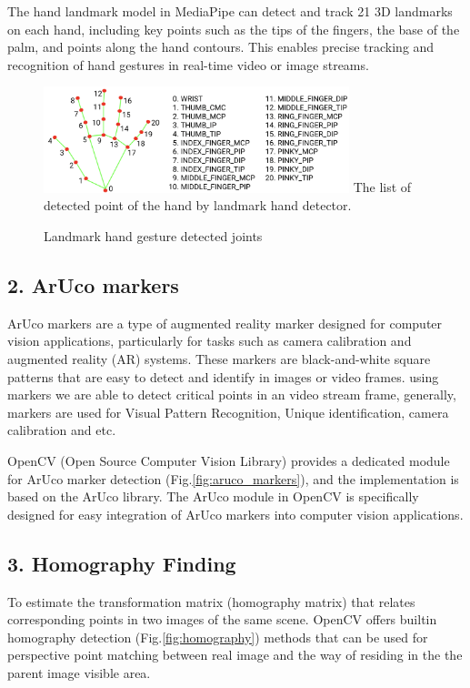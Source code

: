 \documentclass[journal]{IEEEtran}
\begin{document}
The hand landmark model in MediaPipe can detect and track 21 3D landmarks on each hand, including key points such as the tips 
of the fingers, the base of the palm, and points along the hand contours. This enables precise tracking and recognition of hand 
gestures in real-time video or image streams.

\begin{figure}[!t]
  \centering
  \includegraphics[width=3.5in]{photo/hand-landmarks.png}
  The list of detected point of the hand by landmark hand detector.
  \caption{Landmark hand gesture detected joints}
  \label{fig:landmark_hand}
\end{figure}

\subsection*{2. ArUco markers}

ArUco markers are a type of augmented reality marker designed for computer vision applications, particularly for tasks such as 
camera calibration and augmented reality (AR) systems. These markers are black-and-white square patterns that are easy to detect 
and identify in images or video frames. using markers we are able to detect critical points in an video stream frame, generally, 
markers are used for Visual Pattern Recognition, Unique identification, camera calibration and etc. 

OpenCV (Open Source Computer Vision Library) provides a dedicated module for ArUco marker detection (Fig.\ref{fig:aruco_markers}), and the implementation is 
based on the ArUco library. The ArUco module in OpenCV is specifically designed for easy integration of ArUco markers into 
computer vision applications.

\subsection*{3. Homography Finding}

To estimate the transformation matrix (homography matrix) that relates corresponding points in two images of the same scene. OpenCV
offers builtin homography detection (Fig.\ref{fig:homography}) methods that can be used for perspective point matching between real image and the way of residing 
in the the parent image visible area.
\end{document}
